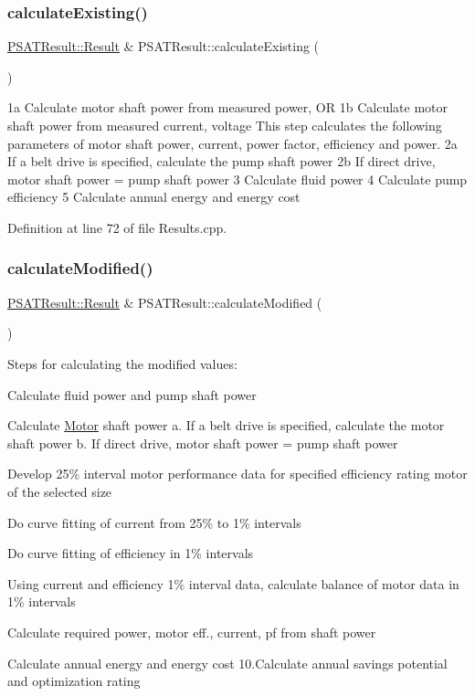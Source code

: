 \subsubsection{\texorpdfstring{calculate\+Existing()}{calculateExisting()}}
{\footnotesize\ttfamily \hyperlink{struct_p_s_a_t_result_1_1_result}{P\+S\+A\+T\+Result\+::\+Result} \& P\+S\+A\+T\+Result\+::calculate\+Existing (\begin{DoxyParamCaption}{ }\end{DoxyParamCaption})}

1a Calculate motor shaft power from measured power, OR 1b Calculate motor shaft power from measured current, voltage This step calculates the following parameters of motor shaft power, current, power factor, efficiency and power. 2a If a belt drive is specified, calculate the pump shaft power 2b If direct drive, motor shaft power = pump shaft power 3 Calculate fluid power 4 Calculate pump efficiency 5 Calculate annual energy and energy cost

Definition at line 72 of file Results.\+cpp.

\mbox{\label{class_p_s_a_t_result_a1404ffd1e9420afd3ff4e9284d145646}} 
\subsubsection{\texorpdfstring{calculate\+Modified()}{calculateModified()}}
{\footnotesize\ttfamily \hyperlink{struct_p_s_a_t_result_1_1_result}{P\+S\+A\+T\+Result\+::\+Result} \& P\+S\+A\+T\+Result\+::calculate\+Modified (\begin{DoxyParamCaption}{ }\end{DoxyParamCaption})}

Steps for calculating the modified values\+:
\begin{DoxyEnumerate}
\item Calculate fluid power and pump shaft power
\item Calculate \hyperlink{struct_motor}{Motor} shaft power a. If a belt drive is specified, calculate the motor shaft power b. If direct drive, motor shaft power = pump shaft power
\item Develop 25\% interval motor performance data for specified efficiency rating motor of the selected size
\item Do curve fitting of current from 25\% to 1\% intervals
\item Do curve fitting of efficiency in 1\% intervals
\item Using current and efficiency 1\% interval data, calculate balance of motor data in 1\% intervals
\item Calculate required power, motor eff., current, pf from shaft power
\item Calculate annual energy and energy cost 10.\+Calculate annual savings potential and optimization rating
\end{DoxyEnumerate}

